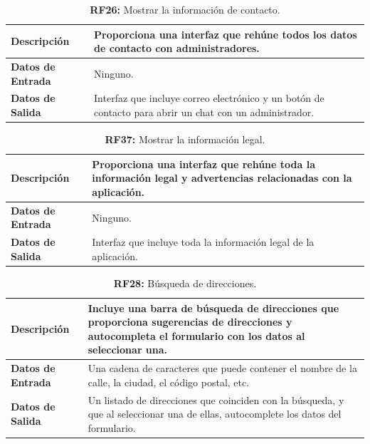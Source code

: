 \documentclass[a4paper, 12pt]{article}
\begin{document}
\begin{table}[H]
\captionsetup{list=no}%
\captionsetup{justification=raggedright,singlelinecheck=false}
\captionsetup{labelformat=empty}
\caption{\textbf{RF26:} Mostrar la información de contacto.}
\label{tab:RF26}
	\begin{tabular}{|m{5cm}|m{10cm}|}
	\hline
	\textbf{Descripción} & Proporciona una interfaz que rehúne todos los datos de contacto con administradores. \\ 
	\hline
	\textbf{Datos de Entrada} & Ninguno. \\ 
	\hline
	\textbf{Datos de Salida} & Interfaz que incluye correo electrónico y un botón de contacto para abrir un chat con un administrador. \\ 
	\hline
\end{tabular}
\end{table}

\begin{table}[H]
\captionsetup{list=no}%
\captionsetup{justification=raggedright,singlelinecheck=false}
\captionsetup{labelformat=empty}
\caption{\textbf{RF37:} Mostrar la información legal.}
\label{tab:RF27}
	\begin{tabular}{|m{5cm}|m{10cm}|}
	\hline
	\textbf{Descripción} & Proporciona una interfaz que rehúne toda la información legal y advertencias relacionadas con la aplicación. \\ 
	\hline
	\textbf{Datos de Entrada} & Ninguno. \\ 
	\hline
	\textbf{Datos de Salida} & Interfaz que incluye toda la información legal de la aplicación. \\ 
	\hline
\end{tabular}
\end{table}

\begin{table}[H]
\captionsetup{list=no}%
\captionsetup{justification=raggedright,singlelinecheck=false}
\captionsetup{labelformat=empty}
\caption{\textbf{RF28:} Búsqueda de direcciones.}
\label{tab:RF28}
	\begin{tabular}{|m{5cm}|m{10cm}|}
	\hline
	\textbf{Descripción} & Incluye una barra de búsqueda de direcciones que proporciona sugerencias de direcciones y autocompleta el formulario con los datos al seleccionar una. \\ 
	\hline
	\textbf{Datos de Entrada} & Una cadena de caracteres que puede contener el nombre de la calle, la ciudad, el código postal, etc. \\ 
	\hline
	\textbf{Datos de Salida} & Un listado de direcciones que coinciden con la búsqueda, y que al seleccionar una de ellas, autocomplete los datos del formulario. \\ 
	\hline
\end{tabular}
\end{table}
\end{document}
